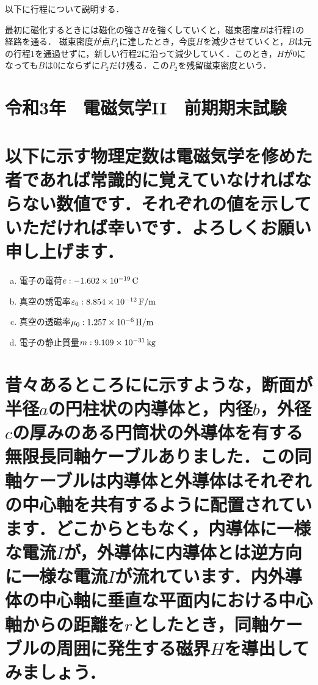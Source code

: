 \documentclass[dvipdfmx]{ujarticle}
\begin{document}
以下に行程について説明する．

最初に磁化するときには磁化の強さ$H$を強くしていくと，磁束密度$B$は行程1の経路を通る．
磁束密度が点$P_1$に達したとき，今度$H$を減少させていくと，$B$は元の行程1を通過せずに，新しい行程2に沿って減少していく．このとき，$H$が$0$になっても$B$は$0$にならずに$P_2$だけ残る．この$P_2$を残留磁束密度という．

\clearpage
\setcounter{section}{0}
\section*{令和3年　電磁気学II　前期期末試験}
\section{以下に示す物理定数は電磁気学を修めた者であれば常識的に覚えていなければならない数値です．それぞれの値を示していただければ幸いです．よろしくお願い申し上げます．}
\begin{enumerate}[(a)]
	\item 電子の電荷$e:-1.602 \times 10^{-19}\,\rm{C}$
	\item 真空の誘電率$\varepsilon_{0}:8.854 \times 10^{-12}\,\rm{F/m}$
	\item 真空の透磁率$\mu_{0}:1.257 \times 10^{-6}\,\rm{H/m}$
	\item 電子の静止質量$m:9.109\times 10^{-31}\,\rm{kg}$
\end{enumerate}

\section{昔々あるところにに示すような，断面が半径$a$の円柱状の内導体と，内径$b$，外径$c$の厚みのある円筒状の外導体を有する無限長同軸ケーブルありました．この同軸ケーブルは内導体と外導体はそれぞれの中心軸を共有するように配置されています．どこからともなく，内導体に一様な電流$I$が，外導体に内導体とは逆方向に一様な電流$I$が流れています．内外導体の中心軸に垂直な平面内における中心軸からの距離を$r$としたとき，同軸ケーブルの周囲に発生する磁界$H$を導出してみましょう．}
\end{document}
